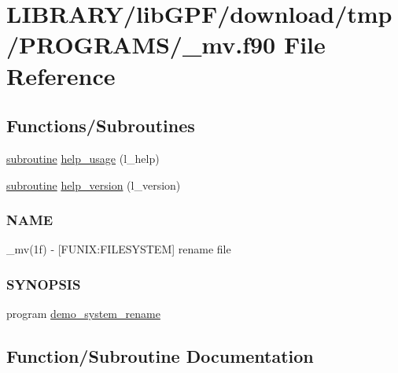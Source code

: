 \hypertarget{__mv_8f90}{}\section{L\+I\+B\+R\+A\+R\+Y/lib\+G\+P\+F/download/tmp/\+P\+R\+O\+G\+R\+A\+M\+S/\+\_\+mv.f90 File Reference}
\label{__mv_8f90}
\subsection*{Functions/\+Subroutines}
\begin{DoxyCompactItemize}
\item 
\hyperlink{M__stopwatch_83_8txt_acfbcff50169d691ff02d4a123ed70482}{subroutine} \hyperlink{__mv_8f90_a3e09a3b52ee8fb04eeb93fe5761626a8}{help\+\_\+usage} (l\+\_\+help)
\item 
\hyperlink{M__stopwatch_83_8txt_acfbcff50169d691ff02d4a123ed70482}{subroutine} \hyperlink{__mv_8f90_a39c21619b08a3c22f19e2306efd7f766}{help\+\_\+version} (l\+\_\+version)
\begin{DoxyCompactList}\small\item\em \subsubsection*{N\+A\+ME}

\+\_\+mv(1f) -\/ \mbox{[}F\+U\+N\+IX\+:F\+I\+L\+E\+S\+Y\+S\+T\+EM\mbox{]} rename file \subsubsection*{S\+Y\+N\+O\+P\+S\+IS}\end{DoxyCompactList}\item 
program \hyperlink{__mv_8f90_aad99fde3e962ae73c9d6bc3825b8ca79}{demo\+\_\+system\+\_\+rename}
\end{DoxyCompactItemize}


\subsection{Function/\+Subroutine Documentation}
\mbox{\label{__mv_8f90_aad99fde3e962ae73c9d6bc3825b8ca79}} 
